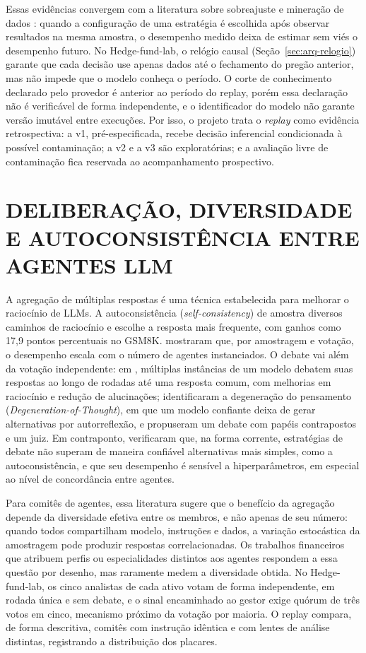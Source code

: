 Essas evidências convergem com a literatura sobre sobreajuste e mineração de dados \citep{White2000, Hansen2005, Bailey2017}: quando a configuração de uma estratégia é escolhida após observar resultados na mesma amostra, o desempenho medido deixa de estimar sem viés o desempenho futuro. No Hedge-fund-lab, o relógio causal (Seção~\ref{sec:arq-relogio}) garante que cada decisão use apenas dados até o fechamento do pregão anterior, mas não impede que o modelo conheça o período. O corte de conhecimento declarado pelo provedor é anterior ao período do replay, porém essa declaração não é verificável de forma independente, e o identificador do modelo não garante versão imutável entre execuções. Por isso, o projeto trata o \textit{replay} como evidência retrospectiva: a v1, pré-especificada, recebe decisão inferencial condicionada à possível contaminação; a v2 e a v3 são exploratórias; e a avaliação livre de contaminação fica reservada ao acompanhamento prospectivo.

\section{DELIBERAÇÃO, DIVERSIDADE E AUTOCONSISTÊNCIA ENTRE AGENTES LLM}

A agregação de múltiplas respostas é uma técnica estabelecida para melhorar o raciocínio de LLMs. A autoconsistência (\textit{self-consistency}) de \citet{Wang2023} amostra diversos caminhos de raciocínio e escolhe a resposta mais frequente, com ganhos como 17,9 pontos percentuais no GSM8K. \citet{Li2024} mostraram que, por amostragem e votação, o desempenho escala com o número de agentes instanciados. O debate vai além da votação independente: em \citet{Du2024}, múltiplas instâncias de um modelo debatem suas respostas ao longo de rodadas até uma resposta comum, com melhorias em raciocínio e redução de alucinações; \citet{Liang2024} identificaram a degeneração do pensamento (\textit{Degeneration-of-Thought}), em que um modelo confiante deixa de gerar alternativas por autorreflexão, e propuseram um debate com papéis contrapostos e um juiz. Em contraponto, \citet{Smit2024} verificaram que, na forma corrente, estratégias de debate não superam de maneira confiável alternativas mais simples, como a autoconsistência, e que seu desempenho é sensível a hiperparâmetros, em especial ao nível de concordância entre agentes.

Para comitês de agentes, essa literatura sugere que o benefício da agregação depende da diversidade efetiva entre os membros, e não apenas de seu número: quando todos compartilham modelo, instruções e dados, a variação estocástica da amostragem pode produzir respostas correlacionadas. Os trabalhos financeiros que atribuem perfis ou especialidades distintos aos agentes \citep{Li2023, Xing2024, TradingAgents2024} respondem a essa questão por desenho, mas raramente medem a diversidade obtida. No Hedge-fund-lab, os cinco analistas de cada ativo votam de forma independente, em rodada única e sem debate, e o sinal encaminhado ao gestor exige quórum de três votos em cinco, mecanismo próximo da votação por maioria. O replay compara, de forma descritiva, comitês com instrução idêntica e com lentes de análise distintas, registrando a distribuição dos placares.

